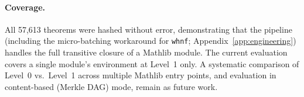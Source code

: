 \paragraph{Coverage.}
All 57{,}613 theorems were hashed without error, demonstrating that
the pipeline (including the micro-batching workaround for
\texttt{whnf}; Appendix~\ref{app:engineering}) handles the full
transitive closure of a Mathlib module.  The current evaluation covers
a single module's environment at Level~1 only.  A systematic comparison
of Level~0 vs.\ Level~1 across multiple Mathlib entry points, and
evaluation in content-based (Merkle DAG) mode, remain as future work.




